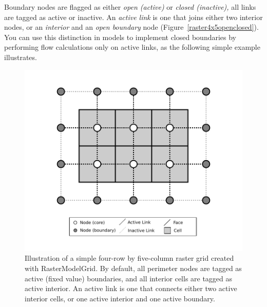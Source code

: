 \documentclass[12pt]{article}
\begin{document}
Boundary nodes are flagged as either {\em open (active)} or {\em closed (inactive),} all links are tagged as active or inactive. An {\em active link} is one that joins either two interior nodes, or an  
{\em interior} and an {\em open boundary} node (Figure~\ref{raster4x5openclosed}). You can use this distinction in models to implement closed boundaries by performing flow calculations only on active links, as the following simple example illustrates.


 \begin{figure}[h!]
    \centering
    \includegraphics{example_raster_grid.pdf}
    \caption{Illustration of a simple four-row by five-column raster grid created with RasterModelGrid. By default, all perimeter nodes are tagged as active (fixed value) boundaries, and all interior cells are tagged as active interior. An active link is one that connects either two active interior cells, or one active interior and one active boundary.}
   \label{raster4x5}
\end{figure}
\end{document}
